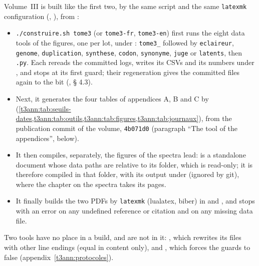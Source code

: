 Volume~III is built like the first two, by the same script and the same \texttt{latexmk} configuration (, ), from :
\begin{itemize}
\item \texttt{./construire.sh tome3} (or \texttt{tome3-fr}, \texttt{tome3-en}) first runs the eight data tools of the figures, one per lot, under : \texttt{tome3\_} followed by \texttt{eclaireur}, \texttt{genome}, \texttt{duplication}, \texttt{synthese}, \texttt{codon}, \texttt{synonyme}, \texttt{juge} or \texttt{latents}, then \texttt{.py}. Each rereads the committed logs, writes its CSVs and its numbers under , and stops at its first guard; their regeneration gives the committed files again to the bit (, § 4.3).
\item Next, it generates the four tables of appendices A, B and C by  (\cref{t3ann:tab:seuils-dates,t3ann:tab:outils,t3ann:tab:figures,t3ann:tab:journaux}), from the  publication commit of the volume, \texttt{4b071d0} (paragraph ``The tool of the appendices'', below).
\item It then compiles, separately, the figures of the spectra lead:  is a standalone document whose data paths are relative to its folder, which is read-only; it is therefore compiled in that folder, with its output under  (ignored by git), where the chapter on the spectra takes its pages.
\item It finally builds the two PDFs by \texttt{latexmk} (lualatex, biber) in  and , and stops with an error on any undefined reference or citation and on any missing data file.
\end{itemize}
Two tools have no place in a build, and are not in it: , which rewrites its files with other line endings (equal in content only), and , which forces the guards to false (appendix~\ref{t3ann:protocoles}).

